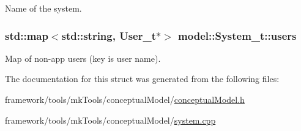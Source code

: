 Name of the system. 

\subsubsection[{\texorpdfstring{users}{users}}]{\setlength{\rightskip}{0pt plus 5cm}std\+::map$<$std\+::string, {\bf User\+\_\+t}$\ast$$>$ model\+::\+System\+\_\+t\+::users}\hypertarget{structmodel_1_1_system__t_af5959523824bf081579c1c0e0773bfce}{}\label{structmodel_1_1_system__t_af5959523824bf081579c1c0e0773bfce}


Map of non-\/app users (key is user name). 



The documentation for this struct was generated from the following files\+:\begin{DoxyCompactItemize}
\item 
framework/tools/mk\+Tools/conceptual\+Model/\hyperlink{conceptual_model_8h}{conceptual\+Model.\+h}\item 
framework/tools/mk\+Tools/conceptual\+Model/\hyperlink{system_8cpp}{system.\+cpp}\end{DoxyCompactItemize}
